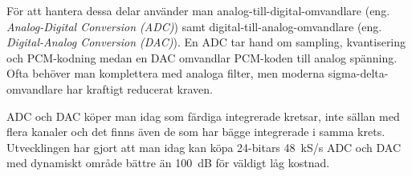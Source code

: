 För att hantera dessa delar använder man analog-till-digital-omvandlare
(eng. \emph{Analog-Digital Conversion (ADC)}) samt digital-till-analog-omvandlare 
(eng. \emph{Digital-Analog Conversion (DAC)}).
En ADC tar hand om sampling, kvantisering och PCM-kodning medan en DAC
omvandlar PCM-koden till analog spänning.
Ofta behöver man komplettera med analoga filter, men moderna sigma-delta-omvandlare 
har kraftigt reducerat kraven.

ADC och DAC köper man idag som färdiga integrerade kretsar, inte sällan med
flera kanaler och det finns även de som har bägge integrerade i samma krets.
Utvecklingen har gjort att man idag kan köpa 24-bitars 48~kS/s ADC och DAC med
dynamiskt område bättre än 100~dB för väldigt låg kostnad.
